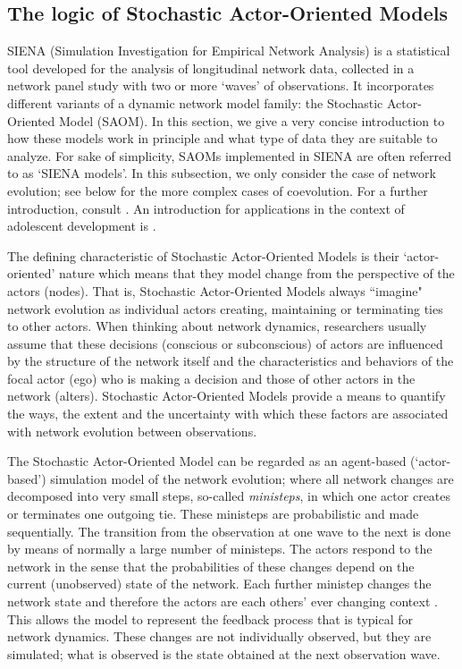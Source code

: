 \documentclass[a4paper,fleqn,11pt]{article}
\newcommand{\+}{\, + \,}
\newcommand{\SI}{{\sf SIENA }}
\newcommand{\SAOM}{{Stochastic Actor-Oriented Model }}
\newcommand{\saom}{{Stochastic Actor-Oriented Model}}
\begin{document}
\subsection{The logic of {\saom}s}
\label{S_logic}

\SI (Simulation Investigation for Empirical Network Analysis) is a
statistical tool developed for the analysis of longitudinal network data,
collected in a network panel study with two or more `waves' of observations.
It incorporates different variants of a dynamic network model family:
the \SAOM (SAOM). In this section, we give
a very concise introduction to how these models work in principle and what
type of data they are suitable to analyze. For sake of simplicity,
SAOMs implemented in \SI are often referred to as `\SI models'.
In this subsection, we only consider the case of network evolution;
see below for the more complex cases of coevolution.
For a further introduction, consult  \citet{SnijdersEA10b}.
An introduction for applications in the context of adolescent
development is \citet{VeenstraEtAl2013}.

The defining characteristic of {\saom}s
is their `actor-oriented' nature which means that they model
change from the perspective of the actors (nodes).
That is, {\saom}s always ``imagine" network evolution
as individual actors creating, maintaining or terminating ties to other actors.
When thinking about network dynamics, researchers usually assume that these
decisions (conscious or subconscious) of actors are influenced by the structure
of the network itself and the characteristics and behaviors of the focal actor
(ego) who is making a decision and those of other actors in the network (alters).
{\saom}s provide a means to quantify the ways, the
extent and the uncertainty with which these factors are associated with
network evolution between observations.

The \SAOM can be regarded as an agent-based (`actor-based') simulation
model of the network evolution; where all network changes are decomposed into
very small steps, so-called \emph{ministeps}, in which
one actor creates or terminates one outgoing tie.
These ministeps are probabilistic and made sequentially.
The transition from the observation
at one wave to the next is done by means of normally a large number of ministeps.
The actors respond to the network in the sense that the probabilities
of these changes depend on the current (unobserved) state of the network.
Each further ministep changes the network state and therefore the actors
are each others' ever changing context  \citep{Zeg94}.
This allows the model to represent the feedback process
that is typical for network dynamics. These changes are not
individually observed, but they are simulated;
what is observed is the state obtained at the next observation wave.
\end{document}
